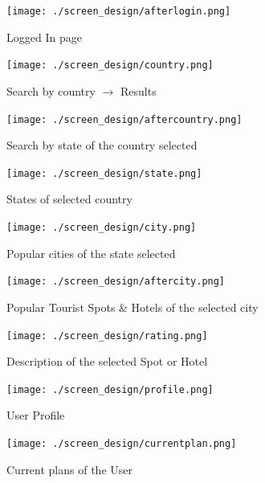\documentclass[11pt]{article}
\begin{document}
\begin{figure}[ht!]
\hfill\texttt{[image: ./screen\_design/afterlogin.png]}\hspace*{\fill}
\caption{Logged In page}
\end{figure}

\begin{figure}[ht!]
\hfill\texttt{[image: ./screen\_design/country.png]}\hspace*{\fill}
\caption{Search by country $\rightarrow$ Results}
\end{figure}

\begin{figure}[ht!]
\hfill\texttt{[image: ./screen\_design/aftercountry.png]}\hspace*{\fill}
\caption{Search by state of the country selected}
\end{figure}

\begin{figure}[ht!]
\hfill\texttt{[image: ./screen\_design/state.png]}\hspace*{\fill}
\caption{States of selected country}
\end{figure}

\begin{figure}[ht!]
\hfill\texttt{[image: ./screen\_design/city.png]}\hspace*{\fill}
\caption{Popular cities of the state selected}
\end{figure}

\begin{figure}[ht!]
\hfill\texttt{[image: ./screen\_design/aftercity.png]}\hspace*{\fill}
\caption{Popular Tourist Spots \& Hotels of the selected city}
\end{figure}

\begin{figure}[ht!]
\hfill\texttt{[image: ./screen\_design/rating.png]}\hspace*{\fill}
\caption{Description of the selected Spot or Hotel}
\end{figure}

\begin{figure}[ht!]
\hfill\texttt{[image: ./screen\_design/profile.png]}\hspace*{\fill}
\caption{User Profile}
\end{figure}

\begin{figure}[ht!]
\hfill\texttt{[image: ./screen\_design/currentplan.png]}\hspace*{\fill}
\caption{Current plans of the User}
\end{figure}
\end{document}

